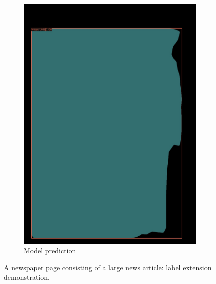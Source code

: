 \documentclass[aspectratio=1610]{beamer}
\begin{document}
\begin{frame}
\begin{figure}
\begin{subfigure}{.25\textwidth}
  \includegraphics[width=0.99\linewidth, clip=true, trim = 0mm 0mm 0mm 0mm]{figures/labels-vanilla-0.75/FZKQ4Zg.jpg}
  \caption{Model prediction}
\end{subfigure}
\caption{A newspaper page consisting of a large news article: label extension demonstration.}
\label{fig:extendedlabel}
\end{figure}
\end{frame}
\normalpage
\end{document}
